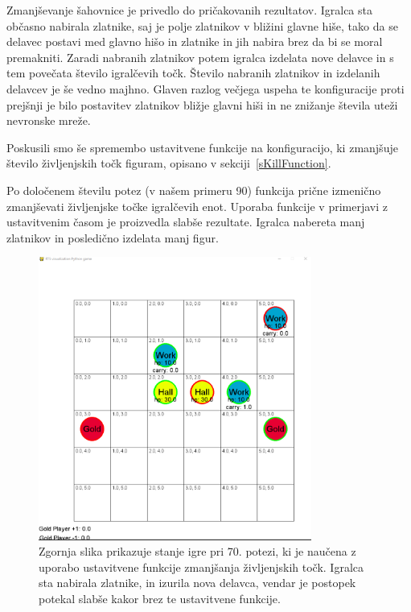 \documentclass[a4paper, 12pt]{book}
\begin{document}
Zmanjševanje šahovnice je privedlo do pričakovanih rezultatov.
Igralca sta občasno nabirala zlatnike, saj je polje zlatnikov v bližini glavne hiše, tako da se delavec postavi med glavno hišo in zlatnike in jih nabira brez da bi se moral premakniti.
Zaradi nabranih zlatnikov potem igralca izdelata nove delavce in s tem povečata število igralčevih točk.
Število nabranih zlatnikov in izdelanih delavcev je še vedno majhno.
Glaven razlog večjega uspeha te konfiguracije proti prejšnji je bilo postavitev zlatnikov bližje glavni hiši in ne znižanje števila uteži nevronske mreže.


Poskusili smo še spremembo ustavitvene funkcije na konfiguracijo, ki zmanjšuje število življenjskih točk figuram, opisano v sekciji~\ref{sKillFunction}.

Po določenem številu potez (v našem primeru 90) funkcija prične izmenično zmanjševati življenjske točke igralčevih enot.
Uporaba funkcije v primerjavi z ustavitvenim časom je proizvedla slabše rezultate.
Igralca nabereta manj zlatnikov in posledično izdelata manj figur.

\begin{figure}[h!]
	\begin{center}
		\includegraphics[width=0.8\textwidth]{photos/killFunction.pdf}
	\end{center}
	\caption{Zgornja slika prikazuje stanje igre pri 70. potezi, ki je naučena z uporabo ustavitvene funkcije zmanjšanja življenjskih točk. 
		Igralca sta nabirala zlatnike, in izurila nova delavca, vendar je postopek potekal slabše kakor brez te ustavitvene funkcije. }
	\label{vizualizacijaRezultatovKillFunction}
\end{figure}
\end{document}
